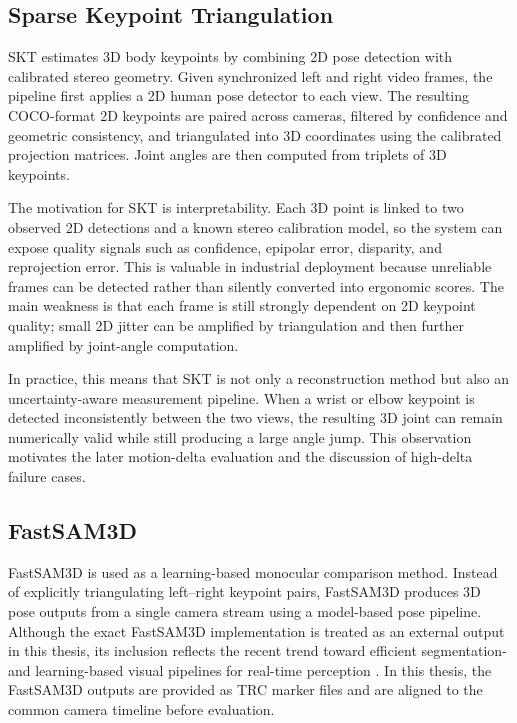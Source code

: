 \documentclass[12pt,a4paper]{article}
\begin{document}
\subsection{Sparse Keypoint Triangulation}

SKT estimates 3D body keypoints by combining 2D pose detection with calibrated
stereo geometry.
Given synchronized left and right video frames, the pipeline first applies a
2D human pose detector to each view.
The resulting COCO-format 2D keypoints are paired across cameras, filtered by
confidence and geometric consistency, and triangulated into 3D coordinates
using the calibrated projection matrices.
Joint angles are then computed from triplets of 3D keypoints.

The motivation for SKT is interpretability.
Each 3D point is linked to two observed 2D detections and a known stereo
calibration model, so the system can expose quality signals such as confidence,
epipolar error, disparity, and reprojection error.
This is valuable in industrial deployment because unreliable frames can be
detected rather than silently converted into ergonomic scores.
The main weakness is that each frame is still strongly dependent on 2D
keypoint quality; small 2D jitter can be amplified by triangulation and then
further amplified by joint-angle computation.

In practice, this means that SKT is not only a reconstruction method but also
an uncertainty-aware measurement pipeline.
When a wrist or elbow keypoint is detected inconsistently between the two
views, the resulting 3D joint can remain numerically valid while still
producing a large angle jump.
This observation motivates the later motion-delta evaluation and the
discussion of high-delta failure cases.

\subsection{FastSAM3D}

FastSAM3D is used as a learning-based monocular comparison method.
Instead of explicitly triangulating left--right keypoint pairs, FastSAM3D
produces 3D pose outputs from a single camera stream using a model-based pose
pipeline.
Although the exact FastSAM3D implementation is treated as an external output
in this thesis, its inclusion reflects the recent trend toward efficient
segmentation- and learning-based visual pipelines for real-time perception
\cite{zhao2023fastsam}.
In this thesis, the FastSAM3D outputs are provided as TRC marker files and are
aligned to the common camera timeline before evaluation.
\end{document}
